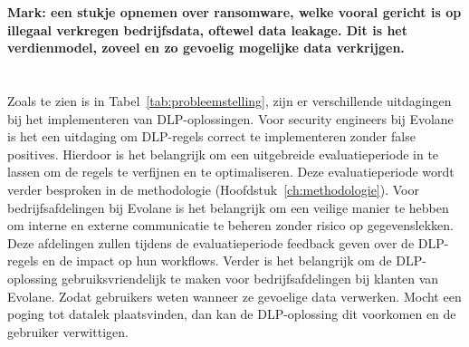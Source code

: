 \textbf{Mark: een stukje opnemen over ransomware, welke vooral gericht is op illegaal verkregen bedrijfsdata, oftewel data leakage. Dit is het verdienmodel, zoveel en zo gevoelig mogelijke data verkrijgen. }

\section{}%
\label{sec:probleemstelling}

Zoals te zien is in Tabel~\ref{tab:probleemstelling}, zijn er verschillende uitdagingen bij het implementeren van DLP-oplossingen. 
Voor security engineers bij Evolane is het een uitdaging om DLP-regels correct te implementeren zonder false positives. Hierdoor is het belangrijk om een uitgebreide evaluatieperiode in te lassen om de regels te verfijnen en te optimaliseren. 
Deze evaluatieperiode wordt verder besproken in de methodologie (Hoofdstuk~\ref{ch:methodologie}). 
Voor bedrijfsafdelingen bij Evolane is het belangrijk om een veilige manier te hebben om interne en externe communicatie te beheren zonder risico op gegevenslekken. 
Deze afdelingen zullen tijdens de evaluatieperiode feedback geven over de DLP-regels en de impact op hun workflows. 
Verder is het belangrijk om de DLP-oplossing gebruiksvriendelijk te maken voor bedrijfsafdelingen bij klanten van Evolane. 
Zodat gebruikers weten wanneer ze gevoelige data verwerken. Mocht een poging tot datalek plaatsvinden, dan kan de DLP-oplossing dit voorkomen en de gebruiker verwittigen.   

